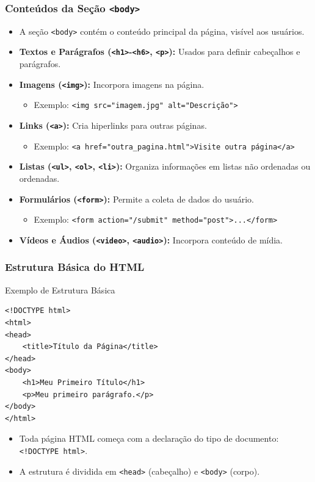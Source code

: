 \begin{frame}[fragile]
  \frametitle{Conteúdos da Seção \texttt{<body>}}
  \begin{itemize}
    \item A seção \texttt{<body>} contém o conteúdo principal da página, visível aos usuários.
    \item \textbf{Textos e Parágrafos (\texttt{<h1>}-\texttt{<h6>}, \texttt{<p>}):} Usados para definir cabeçalhos e parágrafos.
    \item \textbf{Imagens (\texttt{<img>}):} Incorpora imagens na página.
      \begin{itemize}
        \item Exemplo: \texttt{<img src="imagem.jpg" alt="Descrição">}
      \end{itemize}
    \item \textbf{Links (\texttt{<a>}):} Cria hiperlinks para outras páginas.
      \begin{itemize}
        \item Exemplo: \texttt{<a href="outra\_pagina.html">Visite outra página</a>}
      \end{itemize}
    \item \textbf{Listas (\texttt{<ul>}, \texttt{<ol>}, \texttt{<li>}):} Organiza informações em listas não ordenadas ou ordenadas.
    \item \textbf{Formulários (\texttt{<form>}):} Permite a coleta de dados do usuário.
      \begin{itemize}
        \item Exemplo: \texttt{<form action="/submit" method="post">...</form>}
      \end{itemize}
    \item \textbf{Vídeos e Áudios (\texttt{<video>}, \texttt{<audio>}):} Incorpora conteúdo de mídia.
  \end{itemize}
\end{frame}


\begin{frame}[fragile]
  \frametitle{Estrutura Básica do HTML}
  \begin{block}{Exemplo de Estrutura Básica}
    \begin{verbatim}
<!DOCTYPE html>
<html>
<head>
    <title>Título da Página</title>
</head>
<body>
    <h1>Meu Primeiro Título</h1>
    <p>Meu primeiro parágrafo.</p>
</body>
</html>
    \end{verbatim}
  \end{block}
  \begin{itemize}
    \item Toda página HTML começa com a declaração do tipo de documento: \texttt{<!DOCTYPE html>}.
    \item A estrutura é dividida em \texttt{<head>} (cabeçalho) e \texttt{<body>} (corpo).
  \end{itemize}
\end{frame}

